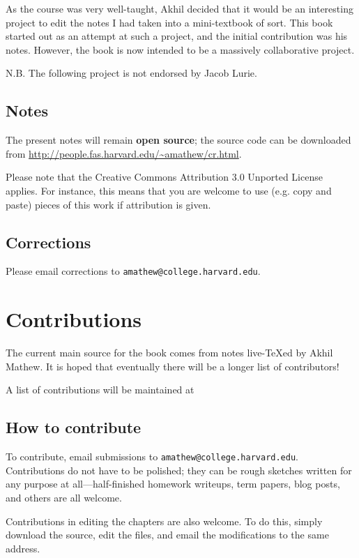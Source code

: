 As the course was very well-taught, Akhil decided that it would be an interesting project to 
edit the notes I had taken into a mini-textbook of sort. This book started out as an
attempt 
at such a project, and the initial contribution was his notes. However, the
book is now intended to be a massively collaborative
project.

N.B. The following project is not endorsed by Jacob Lurie.

\section{Notes}

The present notes will remain \textbf{open source}; the source code can be
downloaded from \url{http://people.fas.harvard.edu/~amathew/cr.html}.

Please note that the Creative Commons Attribution
3.0 Unported License applies. For instance, this means that you are welcome to
use (e.g. copy and paste) pieces of this work if attribution is given.

\section{Corrections}
Please email corrections to
\verb=amathew@college.harvard.edu=.

\newpage

\chapter*{Contributions}

The current main source for the book comes from notes live-TeXed by Akhil
Mathew. It is hoped that eventually there will be a longer list of contributors!

A list of contributions will be maintained at 
\section{How to contribute}


{To contribute,} email submissions to \verb=amathew@college.harvard.edu=. 
Contributions do not have to be polished; they can be rough sketches written
for any purpose at all---half-finished homework writeups, term papers, blog
posts, and others are all welcome.

Contributions in editing the chapters are also welcome. To do this, simply
download the source, edit the files, and email the modifications to the same
address.



\renewcommand{\whattosay}{Lecture \thesection \\ }
